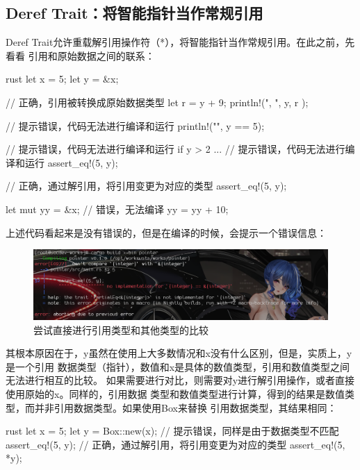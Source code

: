 \subsection{Deref Trait：将智能指针当作常规引用}
Deref Trait允许重载解引用操作符（*），将智能指针当作常规引用。在此之前，先看看
引用和原始数据之间的联系：
\begin{code-block}{rust}
let x = 5;
let y = &x;

// 正确，引用被转换成原始数据类型
let r = y + 9;
println!("{}, {}", y, r );

// 提示错误，代码无法进行编译和运行
println!("{}", y == 5);

// 提示错误，代码无法进行编译和运行
if y > 2 {
    ...
}
// 提示错误，代码无法进行编译和运行
assert_eq!(5, y);

// 正确，通过解引用，将引用变更为对应的类型
assert_eq!(5, y);

let mut yy = &x;
// 错误，无法编译
yy = yy + 10;
\end{code-block}
上述代码看起来是没有错误的，但是在编译的时候，会提示一个错误信息：
\begin{figure}[H]
  \centering
  \includegraphics[width=\linewidth]{rust_pointer_error.png}
  \caption{尝试直接进行引用类型和其他类型的比较}
  \label{fig:rust_pointer_error}
\end{figure}
其根本原因在于，y虽然在使用上大多数情况和x没有什么区别，但是，实质上，y是一个引用
数据类型（指针），数值和x是具体的数值类型，引用和数值类型之间无法进行相互的比较。
如果需要进行对比，则需要对y进行解引用操作，或者直接使用原始的x。同样的，引用数据
类型和数值类型进行计算，得到的结果是数值类型，而并非引用数据类型。如果使用Box来替换
引用数据类型，其结果相同：
\begin{code-block}{rust}
let x = 5;
let y = Box::new(x);
// 提示错误，同样是由于数据类型不匹配
assert_eq!(5, y);
// 正确，通过解引用，将引用变更为对应的类型
assert_eq!(5, *y);
\end{code-block}

